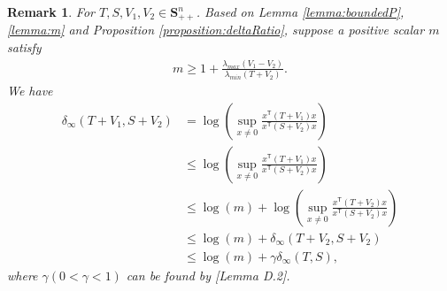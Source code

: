 \documentclass{article}
\newcommand{\transpose}{\mathsf{T}}
\newcommand{\quadinner}[1]{x^{\transpose}(#1)x}
\newtheorem{remark}{Remark}
\begin{document}
\begin{remark}\label{remark:delta}
    For $T,S,V_{1},V_{2}\in \mathbf{S}_{++}^{n}$. Based on Lemma \ref{lemma:boundedP},\ref{lemma:m} and Proposition \ref{proposition:deltaRatio}, suppose a positive scalar $m$ satisfy
    \begin{align*}
        m \geq 1+\frac{\lambda_{max}(V_{1}-V_{2})}{\lambda_{min}(T+V_{2})}.
    \end{align*}
    We have
    \begin{align*}
        \delta_{\infty}(T+V_{1},S+V_{2}) &= \log( \sup_{x\neq 0} \frac{\quadinner{T+V_{1}}}{\quadinner{S+V_{2}}})\\
        &\leq \log(\sup_{x\neq 0} \frac{\quadinner{T+V_{1}}}{\quadinner{S+V_{2}}})\\
        &\leq \log(m)+\log(\sup_{x\neq 0} \frac{\quadinner{T+V_{2}}}{\quadinner{S+V_{2}}})\\
        &\leq \log(m) + \delta_{\infty}(T+V_{2},S+V_{2})\\
        &\leq \log(m) + \gamma\delta_{\infty}(T,S),
    \end{align*}
    where $\gamma(0<\gamma<1)$ can be found by \cite{krauth_finite-time_2019}[Lemma D.2].
\end{remark}
\end{document}
